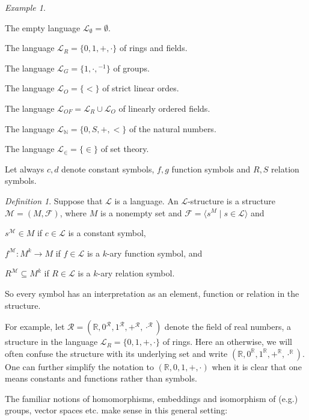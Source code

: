 \documentclass[a4paper, 11pt]{amsart}
\theoremstyle{remark}
\newtheorem{definition}[definition]{Definition}
\newtheorem{example}[example]{Example}
\newcommand{\NN}{\mathbb{N}}
\newcommand{\RR}{\mathbb{R}}
\newcommand{\cF}{\mathcal F}
\newcommand{\cL}{\mathcal L}
\newcommand{\cM}{\mathcal M}
\newcommand{\cR}{\mathcal R}
\newenvironment{enumerate-(1)}{\begin{enumerate}[label={\upshape (\arabic*)}, leftmargin=2pc]}{\end{enumerate}}
\begin{document}
\begin{example}  \
\begin{enumerate-(1)} 
\item 
The empty language $\cL_\emptyset=\emptyset$. 
\item 
The language $\cL_R=\{0,1,+,\cdot\}$ of rings and fields. 
\item 
The language $\cL_G=\{1,\cdot,{}^{-1}\}$ of groups. 
\item 
The language $\cL_O=\{<\}$ of strict linear ordes. 
\item 
The language $\cL_{OF}=\cL_R\cup \cL_O$ of linearly ordered fields. 
\item 
The language $\cL_\NN=\{0,S,+,<\}$ of the natural numbers. 
\item 
The language $\cL_\in=\{\in\}$ of set theory. 
\end{enumerate-(1)} 
\end{example} 

Let always $c,d$ denote constant symbols, $f,g$ function symbols and $R,S$ relation symbols. 

\begin{definition} 
\label{definition L-structure} 
Suppose that $\cL$ is a language. 
An $\cL$-structure is a structure $\cM=(M,\cF)$, where $M$ is a nonempty set and $\cF=\langle s^M \mid s\in \cL\rangle$ and 
\begin{enumerate-(1)} 
\item 
$s^\cM\in M$ if $c\in \cL$ is a constant symbol, 
\item 
$f^\cM\colon M^k\rightarrow M$ if $f\in \cL$ is a $k$-ary function symbol, and 
\item 
$R^\cM \subseteq M^k$ if $R\in \cL$ is a $k$-ary relation symbol. 
\end{enumerate-(1)} 
So every symbol has an interpretation as an element, function or relation in the structure. 
\end{definition} 

For example, let $\cR=(\RR,0^\cR,1^\cR,+^\cR,\cdot^\cR)$ denote the field of real numbers, a structure in the language $\cL_R= \{0,1,+,\cdot\}$ of rings. 
Here an otherwise, we will often confuse the structure with its underlying set and write $(\RR,0^\RR,1^\RR,+^\RR,\cdot^\RR)$. 
One can further simplify the notation to $(\RR,0,1,+,\cdot)$ when it is clear that one means constants and functions rather than symbols. 

The familiar notions of homomorphisms, embeddings and isomorphism of (e.g.) groups, vector spaces etc. make sense in this general setting: 
\end{document}
